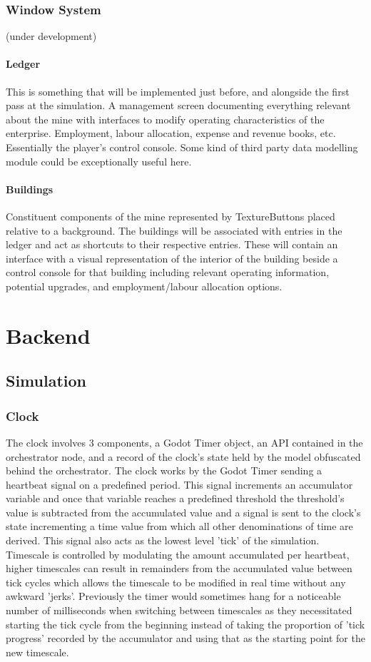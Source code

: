 \documentclass[12pt, a4paper]{scrreprt}
\begin{document}
	\subsection{Window System}
	(under development)
	\subsubsection{Ledger}
	This is something that will be implemented just before, and alongside the first pass at the simulation. A management screen documenting everything relevant about the mine with interfaces to modify operating characteristics of the enterprise. Employment, labour allocation, expense and revenue books, etc. Essentially the player's control console. Some kind of third party data modelling module could be exceptionally useful here.
	\subsubsection{Buildings}
	Constituent components of the mine represented by TextureButtons placed relative to a background. The buildings will be associated with entries in the ledger and act as shortcuts to their respective entries. These will contain an interface with a visual representation of the interior of the building beside a control console for that building including relevant operating information, potential upgrades, and employment/labour allocation options.
	\chapter{Backend}
	\section{Simulation}
	\subsection{Clock}
	The clock involves 3 components, a Godot Timer object, an API contained in the orchestrator node, and a record of the clock's state held by the model obfuscated behind the orchestrator. The clock works by the Godot Timer sending a heartbeat signal on a predefined period. This signal increments an accumulator variable and once that variable reaches a predefined threshold the threshold's value is subtracted from the accumulated value and a signal is sent to the clock's state incrementing a time value from which all other denominations of time are derived. This signal also acts as the lowest level 'tick' of the simulation. Timescale is controlled by modulating the amount accumulated per heartbeat, higher timescales can result in remainders from the accumulated value between tick cycles which allows the timescale to be modified in real time without any awkward 'jerks'. Previously the timer would sometimes hang for a noticeable number of milliseconds when switching between timescales as they necessitated starting the tick cycle from the beginning instead of taking the proportion of 'tick progress' recorded by the accumulator and using that as the starting point for the new timescale.
	
\end{document}
